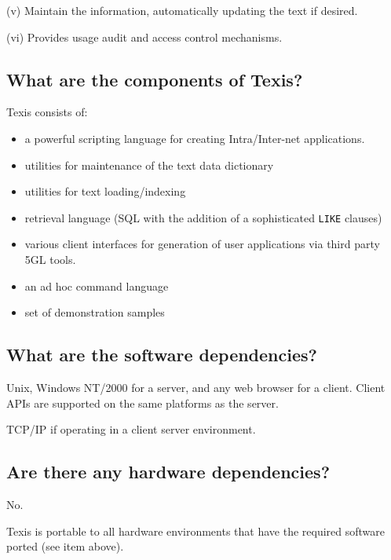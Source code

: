 (v) Maintain the information, automatically updating the text if desired.

(vi) Provides usage audit and access control mechanisms.

\subsection{What are the components of Texis?}

Texis consists of:
\begin{itemize}
 \item  a powerful scripting language for creating Intra/Inter-net applications.

 \item  utilities for maintenance of the text data dictionary

 \item  utilities for text loading/indexing

 \item  retrieval language (SQL with the addition of a sophisticated
\verb`LIKE` clauses)

 \item  various client interfaces for generation of user applications via
third party 5GL tools.

 \item  an ad hoc command language

 \item  set of demonstration samples

\end{itemize}

\subsection{What are the software dependencies?}

Unix, Windows NT/2000 for a server, and any web browser for a client.
Client APIs are supported on the same platforms as the server.

TCP/IP if operating in a client server environment.

\subsection{Are there any hardware dependencies?}

No.

Texis is portable to all hardware environments that
have the required software ported (see item above).

